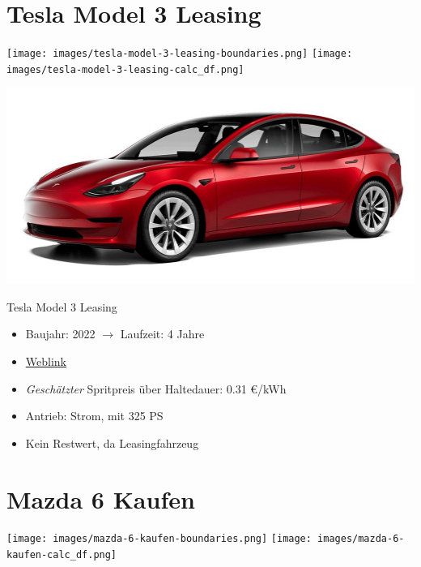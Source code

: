 \documentclass[landscape, DIV=99, 14pt]{scrartcl}
\begin{document}
\pagebreak


\twocolumn

\section*{Tesla Model 3 Leasing}
\begin{center}
\texttt{[image: images/tesla-model-3-leasing-boundaries.png]}
\null
\vspace{0.5cm}
\texttt{[image: images/tesla-model-3-leasing-calc\_df.png]}
\end{center}

\pagebreak
\null
\vspace{2cm}
\begin{center}
\includegraphics[width=0.9\columnwidth]{cars/tesla-model-3-leasing.jpg}

Tesla Model 3 Leasing
\end{center}

\begin{itemize}
    \item Baujahr: 2022 $\rightarrow$ Laufzeit: 4 Jahre
    \item \href{https://www.tesla.com/de_de/model3/design\#overview}{Weblink}
    \item \emph{Gesch\"atzter} Spritpreis \"uber Haltedauer: 0.31 \euro{}/kWh
    \item Antrieb: Strom, mit 325 PS
    \item Kein Restwert, da Leasingfahrzeug
\end{itemize}

\pagebreak


\twocolumn

\section*{Mazda 6 Kaufen}
\begin{center}
\texttt{[image: images/mazda-6-kaufen-boundaries.png]}
\null
\vspace{0.5cm}
\texttt{[image: images/mazda-6-kaufen-calc\_df.png]}
\end{center}
\end{document}
